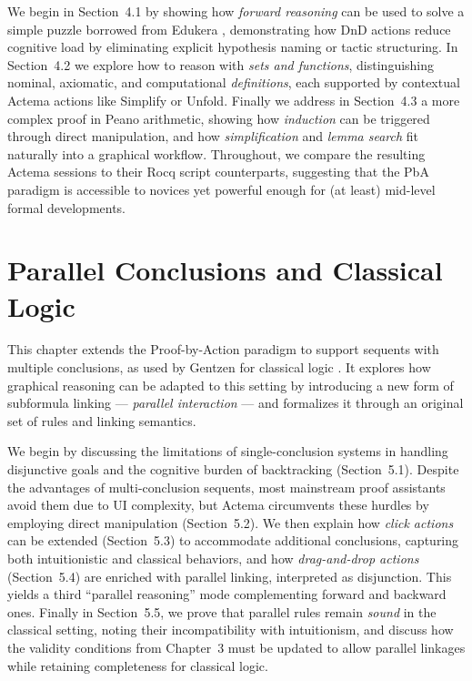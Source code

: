 \documentclass[11pt]{article}
\begin{document}
We begin in Section~4.1 by showing how \emph{forward reasoning} can be used to solve a simple puzzle borrowed from Edukera \cite{edukera}, demonstrating how DnD actions reduce cognitive load by eliminating explicit hypothesis naming or tactic structuring. In Section~4.2 we explore how to reason with \emph{sets and functions}, distinguishing nominal, axiomatic, and computational \emph{definitions}, each supported by contextual Actema actions like \textsf{Simplify} or \textsf{Unfold}. Finally we address in Section~4.3 a more complex proof in Peano arithmetic, showing how \emph{induction} can be triggered through direct manipulation, and how \emph{simplification} and \emph{lemma search} fit naturally into a graphical workflow. Throughout, we compare the resulting Actema sessions to their Rocq script counterparts, suggesting that the PbA paradigm is accessible to novices yet powerful enough for (at least) mid-level formal developments.

\section{Parallel Conclusions and Classical Logic}

This chapter extends the Proof-by-Action paradigm to support sequents with multiple conclusions, as used by Gentzen for classical logic \cite{gentzen_untersuchungen_1935}. It explores how graphical reasoning can be adapted to this setting by introducing a new form of subformula linking --- \emph{parallel interaction} --- and formalizes it through an original set of rules and linking semantics.

We begin by discussing the limitations of single-conclusion systems in handling disjunctive goals and the cognitive burden of backtracking (Section~5.1). Despite the advantages of multi-conclusion sequents, most mainstream proof assistants avoid them due to UI complexity, but Actema circumvents these hurdles by employing direct manipulation (Section~5.2). We then explain how \emph{click actions} can be extended (Section~5.3) to accommodate additional conclusions, capturing both intuitionistic and classical behaviors, and how \emph{drag-and-drop actions} (Section~5.4) are enriched with parallel linking, interpreted as disjunction. This yields a third ``parallel reasoning'' mode complementing forward and backward ones. Finally in Section~5.5, we prove that parallel rules remain \emph{sound} in the classical setting, noting their incompatibility with intuitionism, and discuss how the validity conditions from Chapter~3 must be updated to allow parallel linkages while retaining completeness for classical logic.
\end{document}

